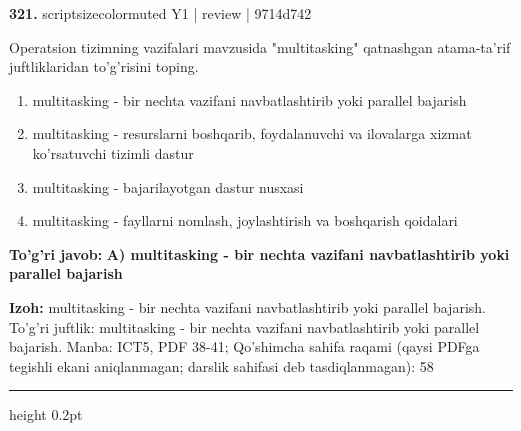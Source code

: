 \documentclass[10pt,a4paper]{article}
\begin{document}
{\bfseries\sffamily\color{ink} 321.} {scriptsizecolor{muted} Y1 | review | 9714d742}
\par
Operatsion tizimning vazifalari mavzusida "multitasking" qatnashgan atama-ta'rif juftliklaridan to'g'risini toping.
\begin{enumerate}[label=\Alph*),leftmargin=9mm]
\item multitasking - bir nechta vazifani navbatlashtirib yoki parallel bajarish
\item multitasking - resurslarni boshqarib, foydalanuvchi va ilovalarga xizmat ko'rsatuvchi tizimli dastur
\item multitasking - bajarilayotgan dastur nusxasi
\item multitasking - fayllarni nomlash, joylashtirish va boshqarish qoidalari
\end{enumerate}
\begin{tcolorbox}[enhanced,breakable,colback=teal!4,colframe=teal!60!black,boxrule=0.45pt,arc=1.2mm,left=2.7mm,right=2.7mm,top=1.8mm,bottom=1.8mm,before skip=2mm,after skip=2mm]
{\bfseries\sffamily\color{teal}To'g'ri javob:} \textbf{A) multitasking - bir nechta vazifani navbatlashtirib yoki parallel bajarish}
\par\smallskip
{\bfseries Izoh:} multitasking - bir nechta vazifani navbatlashtirib yoki parallel bajarish. To'g'ri juftlik: multitasking - bir nechta vazifani navbatlashtirib yoki parallel bajarish. Manba: ICT5, PDF 38-41; Qo'shimcha sahifa raqami (qaysi PDFga tegishli ekani aniqlanmagan; darslik sahifasi deb tasdiqlanmagan): 58
\end{tcolorbox}
\vspace{2mm}\hrule height 0.2pt\vspace{3mm}
\end{document}
